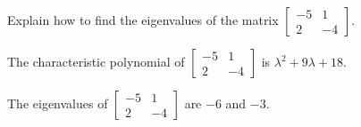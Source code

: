 
\begin{exerciseStatement}


Explain how to find the eigenvalues of the matrix \( \left[\begin{array}{cc}
-5 & 1 \\
2 & -4
\end{array}\right] \).


\end{exerciseStatement}
    
\begin{exerciseAnswer} 


The characteristic polynomial of \( \left[\begin{array}{cc}
-5 & 1 \\
2 & -4
\end{array}\right] \) is \( \lambda^{2} + 9 \lambda + 18 \).



The eigenvalues of \( \left[\begin{array}{cc}
-5 & 1 \\
2 & -4
\end{array}\right] \) are \( -6 \) and \( -3 \).


\end{exerciseAnswer}
    
